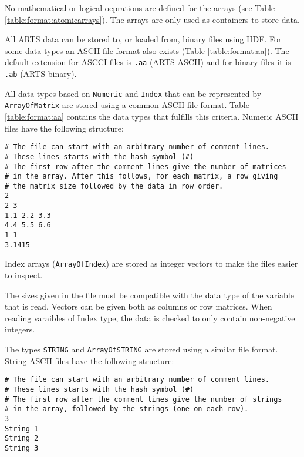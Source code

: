  
 No mathematical or logical oeprations are defined for the arrays (see
 Table \ref{table:format:atomicarrays}). The arrays are only used as
 containers to store data.


 \label{sec:formats:files}
 
 All ARTS data can be stored to, or loaded from, binary files using
 HDF.  For some data types an ASCII file format also exists (Table
 \ref{table:format:aa}). The default extension for ASCCI files is
 \verb|.aa| (ARTS ASCII) and for binary files it is \verb|.ab| (ARTS
 binary).
 
  \label{sec:formats:file:ascii}
  
  All data types based on \verb|Numeric| and \verb|Index| that can be
  represented by \verb|ArrayOfMatrix| are stored using a common ASCII
  file format. Table \ref{table:format:aa} contains the data types that
  fulfills this criteria. Numeric ASCII files have the following 
  structure: \\
  {\footnotesize \begin{verbatim} 
# The file can start with an arbitrary number of comment lines.  
# These lines starts with the hash symbol (#) 
# The first row after the comment lines give the number of matrices 
# in the array. After this follows, for each matrix, a row giving 
# the matrix size followed by the data in row order.  
2 
2 3 
1.1 2.2 3.3 
4.4 5.5 6.6 
1 1 
3.1415
 \end{verbatim} 
}

 \noindent
 Index arrays (\verb|ArrayOfIndex|) are stored as integer vectors to
 make the files easier to inspect.
     
 The sizes given in the file must be compatible with the data type
 of the variable that is read. Vectors can be given both as
 columns or row matrices. When reading varaibles of Index type,
 the data is checked to only contain non-negative integers.
 
 The types \verb|STRING| and \verb|ArrayOfSTRING| are stored using a
 similar file format. String ASCII files have the following structure:
 {\footnotesize \begin{verbatim} 
# The file can start with an arbitrary number of comment lines.
# These lines starts with the hash symbol (#)
# The first row after the comment lines give the number of strings
# in the array, followed by the strings (one on each row).  
3
String 1
String 2
String 3
 \end{verbatim} 
}

